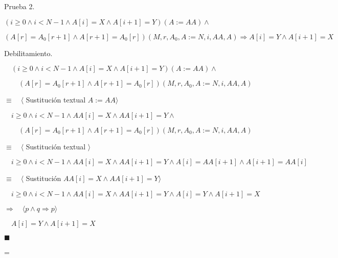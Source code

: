 \documentclass[hidelinks]{article}
\newenvironment{absolutelynopagebreak}
{\par\nobreak\vfil\penalty0\vfilneg
	\vtop\bgroup}
{\par\xdef\tpd{\the\prevdepth}\egroup
	\prevdepth=\tpd}
\begin{document}
\begin{absolutelynopagebreak}
	Prueba 2.\par
	$(i \geq 0 \land i < N - 1 \land A[i] = X \land A[i+1] = Y)(A := AA) \land $\par
	$ (A[r] = A_0[r + 1] \land A[r + 1] = A_0[r])(M, r, A_0, A := N, i, AA, A) \Rightarrow A[i] = Y \land A[i + 1] = X$\par

	Debilitamiento.\par
	$\quad (i \geq 0 \land i < N - 1 \land A[i] = X \land A[i+1] = Y)(A := AA) \land $\par
	$\qquad (A[r] = A_0[r + 1] \land A[r + 1] = A_0[r])(M, r, A_0, A := N, i, AA, A)$\par
	$\equiv \quad \langle$ Sustitución textual $ A := AA \rangle$\par
	$\quad i \geq 0 \land i < N - 1 \land AA[i] = X \land AA[i+1] = Y \land $\par
	$\qquad (A[r] = A_0[r + 1] \land A[r + 1] = A_0[r])(M, r, A_0, A := N, i, AA, A)$\par
	$\equiv \quad \langle$ Sustitución textual $ \rangle$\par
	$\quad i \geq 0 \land i < N - 1 \land AA[i] = X \land AA[i+1] = Y \land A[i] = AA[i + 1] \land A[i + 1] = AA[i]$\par
	$\equiv \quad \langle$ Sustitución $ AA[i] = X \land AA[i+1] = Y \rangle$\par
	$\quad i \geq 0 \land i < N - 1 \land AA[i] = X \land AA[i+1] = Y \land A[i] = Y \land A[i + 1] = X$\par
	$\Rightarrow \quad \langle p \land q \Rightarrow p \rangle$\par
	$\quad A[i] = Y \land A[i + 1] = X$\par
	$\blacksquare$\par
\end{absolutelynopagebreak}
\end{document}
